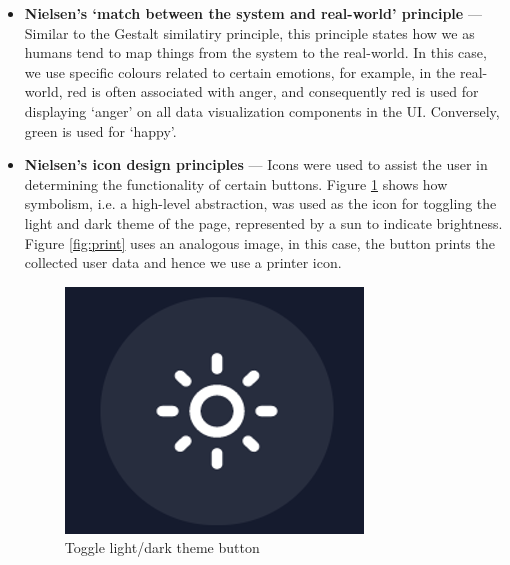 \documentclass[12pt, a4paper]{article}
\begin{document}
\begin{itemize}
    \item \textbf{Nielsen's `match between the system and real-world' principle} --- Similar to the Gestalt similatiry principle, this principle states how we as humans tend to map things from the system to the real-world. In this case, we use specific colours related to certain emotions, for example, in the real-world, red is often associated with anger, and consequently red is used for displaying `anger' on all data visualization components in the UI. Conversely, green is used for `happy'.
    
    \item \textbf{Nielsen's icon design principles} --- Icons were used to assist the user in determining the functionality of certain buttons. Figure \ref{fig:sun} shows how symbolism, i.e. a high-level abstraction, was used as the icon for toggling the light and dark theme of the page, represented by a sun to indicate brightness. Figure \ref{fig:print} uses an analogous image, in this case, the button prints the collected user data and hence we use a printer icon.
    

    \begin{figure}[H]
        \centering
        \includegraphics[scale=0.30]{images/icon-sun.png}
        \caption{Toggle light/dark theme button}
        \label{fig:sun}
    \end{figure}



\end{itemize}
\end{document}
